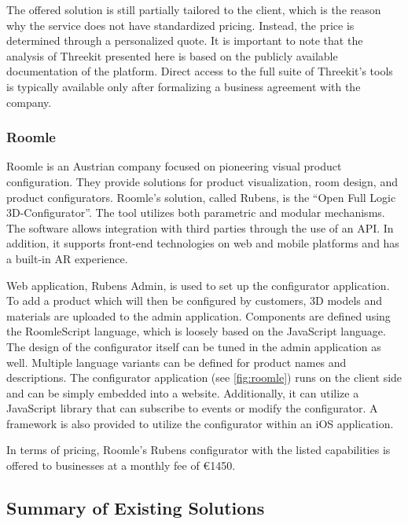 The offered solution is still partially tailored to the client, which is the reason why the service does not have standardized pricing. Instead, the price is determined through a personalized quote. It is important to note that the analysis of Threekit presented here is based on the publicly available documentation of the platform. Direct access to the full suite of Threekit's tools is typically available only after formalizing a business agreement with the company.


\subsubsection{Roomle}

Roomle is an Austrian company focused on pioneering visual product configuration. They provide solutions for product visualization, room design, and product configurators. Roomle's solution, called Rubens, is the \enquote{Open Full Logic 3D-Configurator}. The tool utilizes both parametric and modular mechanisms. The software allows integration with third parties through the use of an API. In addition, it supports front-end technologies on web and mobile platforms and has a built-in AR experience. \cite{RoomleAbout}

Web application, Rubens Admin, is used to set up the configurator application. To add a product which will then be configured by customers, 3D models and materials are uploaded to the admin application. Components are defined using the RoomleScript language, which is loosely based on the JavaScript language. The design of the configurator itself can be tuned in the admin application as well. Multiple language variants can be defined for product names and descriptions. The configurator application (see \autoref{fig:roomle}) runs on the client side and can be simply embedded into a website. Additionally, it can utilize a JavaScript library that can subscribe to events or modify the configurator. A framework is also provided to utilize the configurator within an iOS application. \cite{RoomleDocumentation}

In terms of pricing, Roomle's Rubens configurator with the listed capabilities is offered to businesses at a monthly fee of €1450. \cite{RoomleFullLogic}

\subsection{Summary of Existing Solutions}

